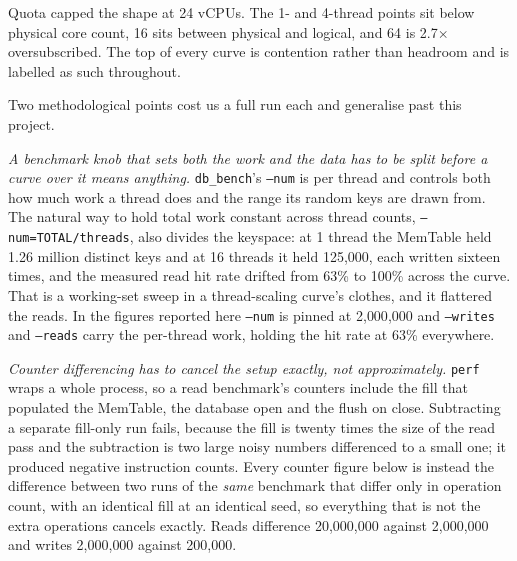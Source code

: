 \documentclass[conference]{IEEEtran}
\begin{document}
Quota capped the shape at 24 vCPUs. The 1- and 4-thread points sit below physical
core count, 16 sits between physical and logical, and 64 is 2.7$\times$
oversubscribed. The top of every curve is contention rather than headroom and is
labelled as such throughout.

Two methodological points cost us a full run each and generalise past this
project.

\emph{A benchmark knob that sets both the work and the data has to be split before
a curve over it means anything.} \texttt{db\_bench}'s \texttt{--num} is per thread
and controls both how much work a thread does and the range its random keys are
drawn from. The natural way to hold total work constant across thread counts,
\texttt{--num=TOTAL/threads}, also divides the keyspace: at 1 thread the MemTable
held 1.26 million distinct keys and at 16 threads it held 125{,}000, each written
sixteen times, and the measured read hit rate drifted from 63\% to 100\% across
the curve. That is a working-set sweep in a thread-scaling curve's clothes, and it
flattered the reads. In the figures reported here \texttt{--num} is pinned at
2{,}000{,}000 and \texttt{--writes} and \texttt{--reads} carry the per-thread work,
holding the hit rate at 63\% everywhere.

\emph{Counter differencing has to cancel the setup exactly, not approximately.}
\texttt{perf} wraps a whole process, so a read benchmark's counters include the
fill that populated the MemTable, the database open and the flush on close.
Subtracting a separate fill-only run fails, because the fill is twenty times the
size of the read pass and the subtraction is two large noisy numbers differenced
to a small one; it produced negative instruction counts. Every counter figure
below is instead the difference between two runs of the \emph{same} benchmark that
differ only in operation count, with an identical fill at an identical seed, so
everything that is not the extra operations cancels exactly. Reads difference
20{,}000{,}000 against 2{,}000{,}000 and writes 2{,}000{,}000 against 200{,}000.
\end{document}
